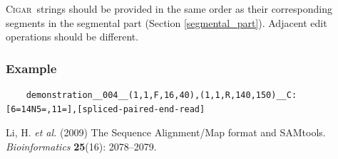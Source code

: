 \documentclass[10pt,a4paper]{article}
\newcommand{\CIGAR}{\textsc{Cigar}}
\begin{document}
\medskip

\CIGAR\ strings should be provided in the same order as their corresponding segments in the {segmental part} (Section \ref{segmental_part}). Adjacent edit operations should be different.

\subsubsection*{Example}

\begin{framed}\small
\begin{verbatim}
	demonstration__004__(1,1,F,16,40),(1,1,R,140,150)__C:[6=14N5=,11=],[spliced-paired-end-read]
\end{verbatim}
\end{framed}





\begin{thebibliography}{}
	Li, H. \textit{et al.} (2009)
	The Sequence Alignment/Map format and SAMtools.
	\textit{Bioinformatics} \textbf{25}(16): 2078--2079.
\end{thebibliography}
\end{document}
